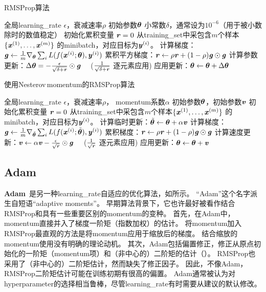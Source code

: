 \begin{algorithm}[ht]
\caption{RMSProp算法}
\label{alg:rms_prop}
\begin{algorithmic}
\REQUIRE 全局\gls{learning_rate} $\epsilon$，衰减速率$\rho$
\REQUIRE  初始参数$\boldsymbol{\theta}$
\REQUIRE 小常数$\delta$，通常设为$10^{-6}$（用于被小数除时的数值稳定）
\STATE 初始化累积变量 $\boldsymbol{\mathit{r}} = 0$
    \STATE 从\gls{training_set}中采包含$m$个样本$\{ \boldsymbol{\mathit{x}}^{(1)},\dots, \boldsymbol{\mathit{x}}^{(m)}\}$ 的\gls{minibatch}，对应目标为$\boldsymbol{\mathit{y}}^{(i)}$。
    \STATE 计算梯度：$\boldsymbol{\mathit{g}} \leftarrow  
         \frac{1}{m} \nabla_{\boldsymbol{\theta}} \sum_i L(f(\boldsymbol{\mathit{x}}^{(i)};\boldsymbol{\theta}),\boldsymbol{\mathit{y}}^{(i)})$ 
    \STATE 累积平方梯度：$\boldsymbol{\mathit{r}} \leftarrow \rho
    \boldsymbol{\mathit{r}} + (1-\rho) \boldsymbol{\mathit{g}} \odot \boldsymbol{\mathit{g}}$
    \STATE 计算参数更新：$\Delta \boldsymbol{\theta} =
    -\frac{\epsilon}{\sqrt{\delta + \boldsymbol{\mathit{r}}}} \odot \boldsymbol{\mathit{g}}$  \ \  ($\frac{1}{\sqrt{\delta + \boldsymbol{\mathit{r}}}}$ 逐元素应用)
    \STATE 应用更新：$\boldsymbol{\theta} \leftarrow \boldsymbol{\theta} + \Delta \boldsymbol{\theta}$
\ENDWHILE
\end{algorithmic}
\end{algorithm}

\begin{algorithm}[ht]
\caption{使用Nesterov\,\gls{momentum}的RMSProp算法}
\label{alg:rms_nesterov}
\begin{algorithmic}
\REQUIRE 全局\gls{learning_rate} $\epsilon$，衰减速率$\rho$， \gls{momentum}系数$\alpha$
\REQUIRE 初始参数$\boldsymbol{\theta}$，初始参数$\boldsymbol{\mathit{v}}$
\STATE 初始化累积变量 $\boldsymbol{\mathit{r}} = 0$
    \STATE 从\gls{training_set}中采包含$m$个样本$\{ \boldsymbol{\mathit{x}}^{(1)},\dots, \boldsymbol{\mathit{x}}^{(m)}\}$ 的\gls{minibatch}，对应目标为$\boldsymbol{\mathit{y}}^{(i)}$。
    \STATE 计算临时更新：$\tilde{\boldsymbol{\theta}} \leftarrow \boldsymbol{\theta} + \alpha \boldsymbol{\mathit{v}}$
    \STATE 计算梯度：$\boldsymbol{\mathit{g}} \leftarrow  
         \frac{1}{m} \nabla_{\tilde{\boldsymbol{\theta}}} \sum_i L(f(\boldsymbol{\mathit{x}}^{(i)};\tilde{\boldsymbol{\theta}}),\boldsymbol{\mathit{y}}^{(i)})$ 
    \STATE  累积梯度：$\boldsymbol{\mathit{r}} \leftarrow \rho
    \boldsymbol{\mathit{r}} + (1-\rho) \boldsymbol{\mathit{g}} \odot \boldsymbol{\mathit{g}}$
    \STATE  计算速度更新：$\boldsymbol{\mathit{v}} \leftarrow \alpha \boldsymbol{\mathit{v}}
    -\frac{\epsilon}{\sqrt{\boldsymbol{\mathit{r}}}} \odot \boldsymbol{\mathit{g}}$ \ \  ($\frac{1}{\sqrt{\boldsymbol{\mathit{r}}}}$ 逐元素应用)
    \STATE 应用更新：$\boldsymbol{\theta} \leftarrow \boldsymbol{\theta} + \boldsymbol{\mathit{v}}$
\ENDWHILE
\end{algorithmic}
\end{algorithm}


\subsection{Adam}
\label{sec:adam}
\textbf{Adam}~\citep{kingma2014adam}是另一种\gls{learning_rate}自适应的优化算法，如所示。
``Adam''这个名字派生自短语``adaptive moments''。
早期算法背景下，它也许最好被看作结合RMSProp和具有一些重要区别的\gls{momentum}的变种。
首先，在Adam中，\gls{momentum}直接并入了梯度一阶矩（指数加权）的估计。
将\gls{momentum}加入RMSProp最直观的方法是将\gls{momentum}应用于缩放后的梯度。
结合缩放的\gls{momentum}使用没有明确的理论动机。
其次，Adam包括偏置修正，修正从原点初始化的一阶矩（\gls{momentum}项）和（非中心的）二阶矩的估计（）。
RMSProp也采用了（非中心的）二阶矩估计，然而缺失了修正因子。
因此，不像Adam，RMSProp二阶矩估计可能在训练初期有很高的偏置。
Adam通常被认为对\gls{hyperparameter}的选择相当鲁棒，尽管\gls{learning_rate}有时需要从建议的默认修改。

